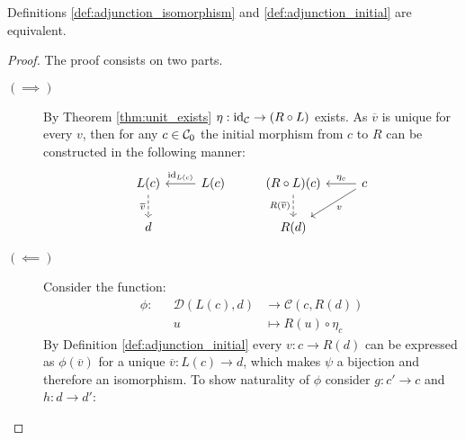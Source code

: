 \begin{theorem}
  Definitions \ref{def:adjunction_isomorphism} and \ref{def:adjunction_initial}
  are equivalent.

  \begin{proof}
    The proof consists on two parts.
    \begin{description}
      \item[$(\implies)$] By Theorem \ref{thm:unit_exists} $\eta:\mathrm{id}_{\mathcal{C}}\to
        (R\circ L)$ exists. As $\overline{v}$ is unique for every $v$, then for any
        $c\in \mathcal{C}_0$ the initial morphism from $c$ to $R$ can be constructed in
        the following manner:
        \[\begin{tikzcd}[ampersand replacement=\&]
          {L(c)} \& {L(c)} \& {(R\circ L)(c)} \& c \\
          d \&\& {R(d)}
          \arrow["{\id_{L(c)}}"', from=1-2, to=1-1]
          \arrow["{\eta_c}"', from=1-4, to=1-3]
          \arrow["v", from=1-4, to=2-3]
          \arrow["{\overline{v}}"', dashed, from=1-1, to=2-1]
          \arrow["{R(\overline{v})}"', dashed, from=1-3, to=2-3]
        \end{tikzcd}\]
      \item[$(\impliedby)$] Consider the function:
        \[
          \begin{aligned}
            \phi:&&\mathcal{D}(L(c), d) &\to \mathcal{C}(c, R(d))\\
            && u &\mapsto R(u) \circ \eta_c
          \end{aligned}
        \]
        By Definition \ref{def:adjunction_initial} every $v:c\to R(d)$ can be
        expressed as $\phi(\overline{v})$ for a unique $\overline{v}:L(c)\to d$, which
        makes $\psi$ a bijection and therefore an isomorphism. To show
        naturality of $\phi$ consider $g:c'\to c$ and $h:d\to d'$:

\end{description}
\end{proof}
\end{theorem}
